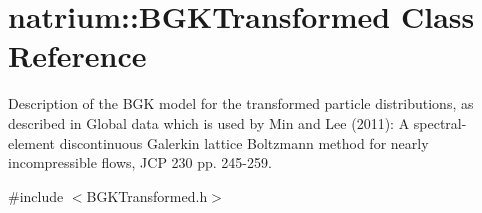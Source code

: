 \hypertarget{classnatrium_1_1BGKTransformed}{\section{natrium\-:\-:B\-G\-K\-Transformed Class Reference}
\label{classnatrium_1_1BGKTransformed}
}


Description of the B\-G\-K model for the transformed particle distributions, as described in Global data which is used by Min and Lee (2011)\-: A spectral-\/element discontinuous Galerkin lattice Boltzmann method for nearly incompressible flows, J\-C\-P 230 pp. 245-\/259.  




{\ttfamily \#include $<$B\-G\-K\-Transformed.\-h$>$}

